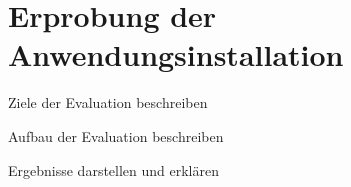 \chapter{Erprobung der Anwendungsinstallation}\label{ch:evaluation}

\begin{draftcontent}
\item Ziele der Evaluation beschreiben
\item Aufbau der Evaluation beschreiben
\item Ergebnisse darstellen und erklären
\end{draftcontent}

\blindtext
